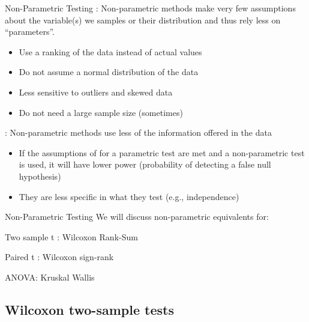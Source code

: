 \documentclass[
  ignorenonframetext,
  aspectratio=169]{beamer}
\providecommand{\tightlist}{%
  \setlength{\itemsep}{0pt}\setlength{\parskip}{0pt}}
\renewcommand{\textbf}{\structure}
\begin{document}
\begin{frame}{Non-Parametric Testing}
\protect\hypertarget{non-parametric-testing-2}{}
\textbf{PROS}: Non-parametric methods make very few assumptions about
the variable(s) we samples or their distribution and thus rely less on
``parameters''.

\begin{itemize}
\tightlist
\item
  Use a ranking of the data instead of actual values
\item
  Do not assume a normal distribution of the data
\item
  Less sensitive to outliers and skewed data
\item
  Do not need a large sample size (sometimes)
\end{itemize}

\textbf{CONS}: Non-parametric methods use less of the information
offered in the data

\begin{itemize}
\tightlist
\item
  If the assumptions of for a parametric test are met and a
  non-parametric test is used, it will have lower power (probability of
  detecting a false null hypothesis)
\item
  They are less specific in what they test (e.g., independence)
\end{itemize}
\end{frame}

\begin{frame}{Non-Parametric Testing}
\protect\hypertarget{non-parametric-testing-3}{}
We will discuss non-parametric equivalents for:

Two sample t : Wilcoxon Rank-Sum

Paired t : Wilcoxon sign-rank

ANOVA: Kruskal Wallis
\end{frame}

\hypertarget{wilcoxon-two-sample-tests}{%
\subsection{Wilcoxon two-sample tests}\label{wilcoxon-two-sample-tests}}
\end{document}

